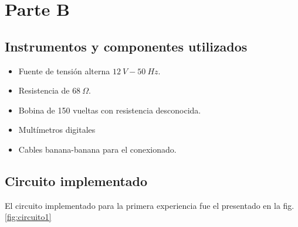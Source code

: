 \section{Parte B}

\subsection{Instrumentos y componentes utilizados}

\begin{itemize}
    \item Fuente de tensión alterna $12\ V - 50\ Hz$.
    \item Resistencia de $68\ \Omega$.
    \item Bobina de 150 vueltas con resistencia desconocida.
    \item Multímetros digitales
    \item Cables banana-banana para el conexionado.
\end{itemize}

\subsection{Circuito implementado}

El circuito implementado para la primera experiencia fue el presentado en la fig. \ref{fig:circuito1}

